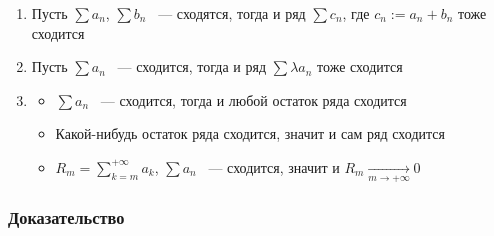 \documentclass{article}
\begin{document}
                \begin{enumerate}
            
                    \item Пусть $\sum a_n$, $\sum b_n$ ~--- сходятся, тогда и ряд $\sum c_n$, где $c_n := a_n + b_n$ тоже сходится
                
                    \item Пусть $\sum a_n$ ~--- сходится, тогда и ряд $\sum \lambda a_n$ тоже сходится
                
                    \item 
                
                        \begin{itemize}
                    
                            \item $\sum a_n$ ~--- сходится, тогда и любой остаток ряда сходится
                        
                            \item Какой-нибудь остаток ряда сходится, значит и сам ряд сходится
                        
                            \item $R_m = \sum\limits_{k = m}^{+\infty} a_k$, $\sum a_n$ ~--- сходится, значит и $R_m \xrightarrow[m \rightarrow +\infty]{} 0$
                        
                        \end{itemize}
                    
                \end{enumerate}
            
            \subsubsection{Доказательство}
            
\end{document}
